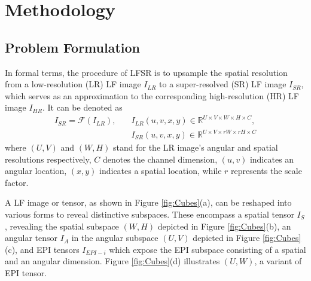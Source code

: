 

\section{Methodology}
\subsection{Problem Formulation} \label{section:Preliminary}
In formal terms, the procedure of LFSR is to upsample the spatial resolution from a low-resolution (LR) LF image $I_{LR}$ to a super-resolved (SR) LF image $I_{SR}$, which serves as an approximation to the corresponding high-resolution (HR) LF image $I_{HR}$. It can be denoted as
\begin{equation}\label{eq:obj}
\begin{split}
    I_{SR} = \mathcal{F}(I_{LR}), & \quad I_{LR}(u,v,x,y) \in \mathbb{R}^{U \times V \times W \times H \times C}, \\
    & \quad I_{SR}(u,v,x,y) \in \mathbb{R}^{U \times V \times rW \times rH \times C}
\end{split}
\end{equation}
where $(U, V)$ and $(W, H)$ stand for the LR image's angular and spatial resolutions respectively, $C$ denotes the channel dimension, $(u, v)$ indicates an angular location, $(x, y)$ indicates a spatial location, while $r$ represents the scale factor. 

A LF image or tensor, as shown in Figure \ref{fig:Cubes}(a), can be reshaped into various forms to reveal distinctive subspaces. These encompass a spatial tensor $I_S$, revealing the spatial subspace $(W, H)$ depicted in Figure \ref{fig:Cubes}(b), an angular tensor $I_A$ in the angular subspace $(U, V)$ depicted in Figure \ref{fig:Cubes}(c), and EPI tensors $I_{EPI-i}$ which expose the EPI subspace consisting of a spatial and an angular dimension. Figure \ref{fig:Cubes}(d) illustrates $(U, W)$, a variant of EPI tensor.

